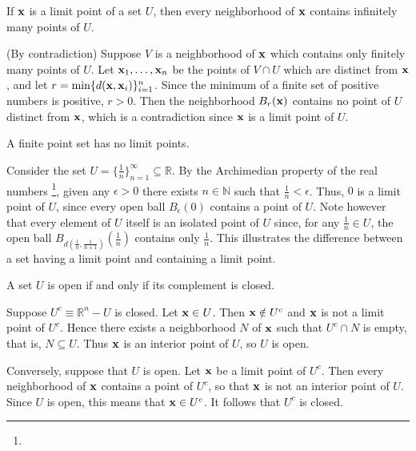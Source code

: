 \documentclass[12pt,letterpaper,reqno]{article}
\numberwithin{equation}{section}
\newcommand{\R}{\ensuremath{\mathbb R}}
\newcommand{\N}{{\mathbb N}}
\newcommand{\bx}{{\bf x}}
\newcommand{\fixme}[1]{{\color{orange}{[#1]}}}
\begin{document}
{\begin{thm}
	If $\bx$ is a limit point of a set $U$, then every neighborhood of $\bx$ contains infinitely many points of $U$.	
\end{thm}

\begin{pf}
(By contradiction) Suppose $V$ is a neighborhood of $\bx$ which contains only finitely many points of $U$. Let $\bx_1,\dots,\bx_n$ be the points of $V \cap U$ which are distinct from $\bx$, and let $r=\min\{d(\bx,\bx_i)\}_{i=1}^n$. Since the minimum of a finite set of positive numbers is positive, $r>0$. Then the neighborhood $B_r(\bx)$ contains no point of $U$ distinct from $\bx$, which is a contradiction since $\bx$ is a limit point of $U$.
\end{pf}

\begin{cor}
A finite point set has no limit points.	
\end{cor}

\begin{example}
Consider the set $U=\{\frac{1}{n}\}_{n=1}^\infty \subseteq \R$. By the Archimedian property of the real numbers \footnote{\fixme{Explain this.}}, given any $\epsilon>0$ there exists $n \in \N$ such that $\frac{1}{n}<\epsilon$. Thus, $0$ is a limit point of $U$, since every open ball $B_\epsilon(0)$ contains a point of $U$. Note however that every element of $U$ itself is an isolated point of $U$ since, for any $\frac{1}{n} \in U$, the open ball $B_{d(\frac{1}{n},\frac{1}{n+1})}(\frac{1}{n})$ contains only $\frac{1}{n}$. This illustrates the difference between a set having a limit point and containing a limit point. 	
\end{example}

\begin{thm}
A set $U$ is open if and only if its complement is closed.	
\end{thm}

\begin{pf}
Suppose $U^c\equiv\R^n-U$ is closed. Let $\bx \in U$. Then $\bx \notin U^c$ and $\bx$ is not a limit point of $U^c$. Hence there exists a neighborhood $N$ of $\bx$ such that $U^c \cap N$ is empty, that is, $N \subseteq U$. Thus $\bx$ is an interior point of $U$, so $U$ is open.

Conversely, suppose that $U$ is open. Let $\bx$ be a limit point of $U^c$. Then every neighborhood of $\bx$ contains a point of $U^c$, so that $\bx$ is not an interior point of $U$. Since $U$ is open, this means that $\bx \in U^c$. It follows that $U^c$ is closed.
\end{pf}

}
\end{document}
